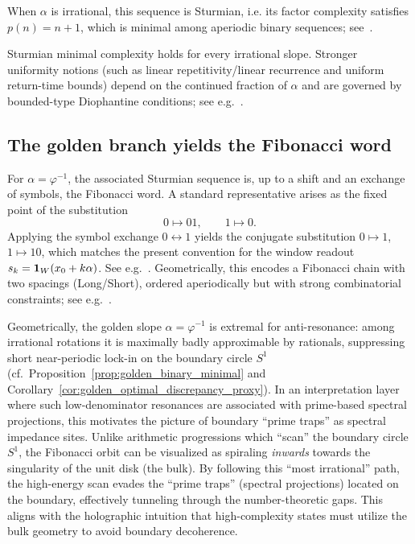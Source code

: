 When $\alpha$ is irrational, this sequence is Sturmian, i.e. its factor complexity satisfies $p(n)=n+1$, which is minimal among aperiodic binary sequences; see~\cite{MorseHedlund1940,Lothaire2002}.
\begin{remark}
Sturmian minimal complexity holds for every irrational slope. Stronger uniformity notions (such as linear repetitivity/linear recurrence and uniform return-time bounds) depend on the continued fraction of $\alpha$ and are governed by bounded-type Diophantine conditions; see e.g.~\cite{LagariasPleasants2003,BugeaudLaurent2005}.
\end{remark}

\subsection{The golden branch yields the Fibonacci word}
For $\alpha=\varphi^{-1}$, the associated Sturmian sequence is, up to a shift and an exchange of symbols, the Fibonacci word. A standard representative arises as the fixed point of the substitution
$$
0\mapsto 01,\qquad 1\mapsto 0.
$$
Applying the symbol exchange $0\leftrightarrow 1$ yields the conjugate substitution $0\mapsto 1$, $1\mapsto 10$, which matches the present convention for the window readout $s_k=\mathbf{1}_W(x_0+k\alpha)$. See e.g.~\cite{Lothaire2002}. Geometrically, this encodes a Fibonacci chain with two spacings (Long/Short), ordered aperiodically but with strong combinatorial constraints; see e.g.~\cite{Moody2000}.

\begin{remark}
\label{rem:prime_traps_inward_dive}
Geometrically, the golden slope $\alpha=\varphi^{-1}$ is extremal for anti-resonance: among irrational rotations it is maximally badly approximable by rationals, suppressing short near-periodic lock-in on the boundary circle $S^1$ (cf.\ Proposition~\ref{prop:golden_binary_minimal} and Corollary~\ref{cor:golden_optimal_discrepancy_proxy}). In an interpretation layer where such low-denominator resonances are associated with prime-based spectral projections, this motivates the picture of boundary ``prime traps'' as spectral impedance sites. Unlike arithmetic progressions which ``scan'' the boundary circle $S^1$, the Fibonacci orbit can be visualized as spiraling \emph{inwards} towards the singularity of the unit disk (the bulk). By following this ``most irrational'' path, the high-energy scan evades the ``prime traps'' (spectral projections) located on the boundary, effectively tunneling through the number-theoretic gaps. This aligns with the holographic intuition that high-complexity states must utilize the bulk geometry to avoid boundary decoherence.
\end{remark}
